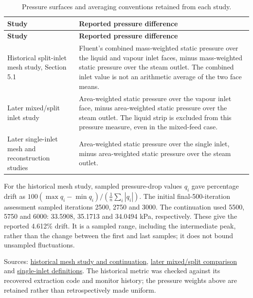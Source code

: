 \begin{longtable}{@{}>{\raggedright\arraybackslash}p{0.29000000\dimexpr\linewidth-2\tabcolsep\relax}>{\raggedright\arraybackslash}p{0.71000000\dimexpr\linewidth-2\tabcolsep\relax}@{}}
\caption{Pressure surfaces and averaging conventions retained from each study.}\label{tab:table-B.3}\\
\toprule
\textbf{Study} & \textbf{Reported pressure difference} \\
\midrule
\endfirsthead
\toprule
\textbf{Study} & \textbf{Reported pressure difference} \\
\midrule
\endhead
Historical split-inlet mesh study, Section 5.1 & Fluent's combined mass-weighted static pressure over the liquid and vapour inlet faces, minus mass-weighted static pressure over the steam outlet. The combined inlet value is not an arithmetic average of the two face means. \\
Later mixed/split inlet study & Area-weighted static pressure over the vapour inlet face, minus area-weighted static pressure over the steam outlet. The liquid strip is excluded from this pressure measure, even in the mixed-feed case. \\
Later single-inlet mesh and reconstruction studies & Area-weighted static pressure over the single inlet, minus area-weighted static pressure over the steam outlet. \\
\bottomrule
\end{longtable}

For the historical mesh study, sampled pressure-drop values \(q_i\) gave percentage drift as \(100(\max q_i-\min q_i)/(\frac{1}{n}\sum_i|q_i|)\). The initial final-500-iteration assessment sampled iterations 2500, 2750 and 3000. The continuation used 5500, 5750 and 6000: 33.5908, 35.1713 and 34.0494 kPa, respectively. These give the reported 4.612\% drift. It is a sampled range, including the intermediate peak, rather than the change between the first and last samples; it does not bound unsampled fluctuations.

Sources: \href{https://github.com/Shuhei-uni/P4P_knowledgeWiki/blob/main/Project/experiments/phase-02-parity-reset-and-pre-v2-qualification/purnanto-08b-parity-split-inlet/mesh-convergence-checkpoint-20260803.md}{historical mesh study and continuation}, \href{https://github.com/Shuhei-uni/P4P_knowledgeWiki/blob/main/Project/experiments/phase-08-storyline-reconstruction/stage-01-60k-storyline/results.md}{later mixed/split comparison} and \href{https://github.com/Shuhei-uni/P4P_knowledgeWiki/blob/main/Project/experiments/phase-10-single-inlet-mesh-convergence/setup.md}{single-inlet definitions}. The historical metric was checked against its recovered extraction code and monitor history; the pressure weights above are retained rather than retrospectively made uniform.

